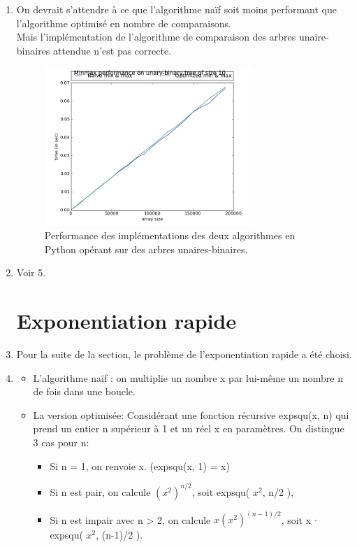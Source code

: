\documentclass[paper=a4, fontsize=11pt]{scrartcl}
\numberwithin{equation}{section}		%
\numberwithin{figure}{section}			%
\numberwithin{table}{section}				%
\begin{document}
\begin{enumerate}
	\item On devrait s'attendre à ce que l'algorithme naïf soit moins performant que l'algorithme optimisé en nombre de comparaisons. \\
    Mais l'implémentation de l'algorithme de comparaison des arbres unaire-binaires attendue n'est pas correcte.

\begin{figure}[!ht]
  \caption{Performance des implémentations des deux algorithmes en Python opérant sur des arbres unaires-binaires.}
\centering\includegraphics[width=0.75\textwidth]{aubminmax200k_py.png}
\end{figure}

	\item Voir 5.

\section{Exponentiation rapide}

	\item Pour la suite de la section, le problème de l'exponentiation rapide a été choisi.

   	\item

\begin{itemize}
    \item L'algorithme naïf : on multiplie un nombre x par lui-même un nombre n de fois dans une boucle.
    \item La version optimisée: Considérant une fonction récursive expsqu(x, n) qui prend un entier n supérieur à 1 et un réel
x en paramètres. On distingue 3 cas pour n:
\begin{itemize}[label=$\bullet$]
\item Si n = 1, on renvoie x. (expsqu(x, 1) = x)
\item Si n est pair, on calcule \( (x^2)^{n/2} \), soit expsqu( \(x^2\), n/2 ),
\item Si n est impair avec n > 2, on calcule \( x(x^2)^{(n-1)/2} \), soit x $\cdot$ expsqu( \( x^2 \), (n-1)/2 ).
\end{itemize}
\end{itemize}


\end{enumerate}
\end{document}
